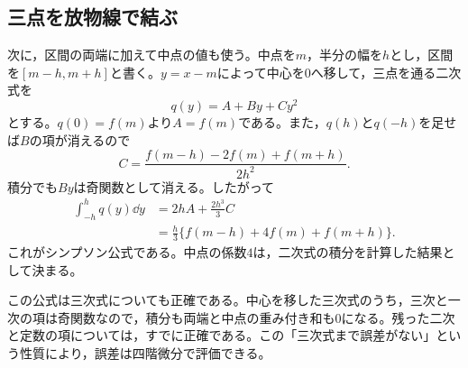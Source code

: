 \subsection{三点を放物線で結ぶ}

次に，区間の両端に加えて中点の値も使う。中点を$m$，半分の幅を$h$とし，区間を$[m-h,m+h]$と書く。$y=x-m$によって中心を$0$へ移して，三点を通る二次式を
\[
 q(y)=A+By+Cy^2
\]
とする。$q(0)=f(m)$より$A=f(m)$である。また，$q(h)$と$q(-h)$を足せば$B$の項が消えるので
\[
 C=\frac{f(m-h)-2f(m)+f(m+h)}{2h^2}.
\]
積分でも$By$は奇関数として消える。したがって
\[
\begin{aligned}
 \int_{-h}^hq(y)\dd y
 &=2hA+\frac{2h^3}{3}C\\
 &=\frac h3\{f(m-h)+4f(m)+f(m+h)\}.
\end{aligned}
\]
これがシンプソン公式である。中点の係数$4$は，二次式の積分を計算した結果として決まる。

この公式は三次式についても正確である。中心を移した三次式のうち，三次と一次の項は奇関数なので，積分も両端と中点の重み付き和も$0$になる。残った二次と定数の項については，すでに正確である。この「三次式まで誤差がない」という性質により，誤差は四階微分で評価できる。


